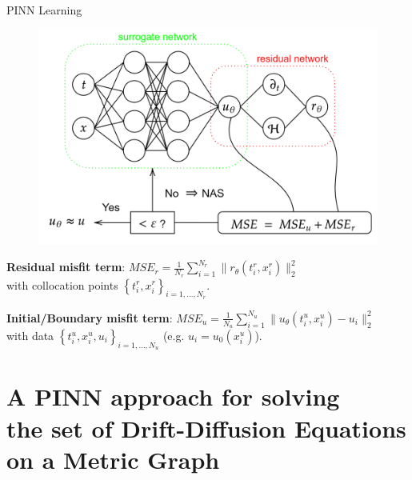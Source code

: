 \documentclass[9pt]{beamer}
\begin{document}
\begin{frame}{PINN Learning}

    \begin{figure}[H]
        \begin{center}
            \includegraphics[scale=0.15]{img/PINN.png}
        \end{center}
    \end{figure}

    \textbf{Residual misfit term}: $MSE_r = \frac{1}{N_r} \sum^{N_r}_{i = 1} \lVert r_\theta \left(t^{r}_i, x^{r}_i\right) \rVert^{2}_{2}$ \\ 
    with collocation points $\left\{t^{r}_i, x^{r}_i \right\}_{i = 1, \ldots, N_r}$. 

    \textbf{Initial/Boundary misfit term}: $MSE_u = \frac{1}{N_u} \sum^{N_u}_{i = 1} \lVert u_\theta\left(t^{u}_i, x^{u}_i\right) - u_i \rVert^{2}_{2}$ \\
    with data $\left\{t^{u}_i, x^{u}_i, u_i \right\}_{i = 1, \ldots, N_u}$ (e.g. $u_i = u_0 \left(x^{u}_i\right)$). 
\end{frame}



\section{A PINN approach for solving \\ the set of Drift-Diffusion Equations \\ on a Metric Graph}
\end{document}
